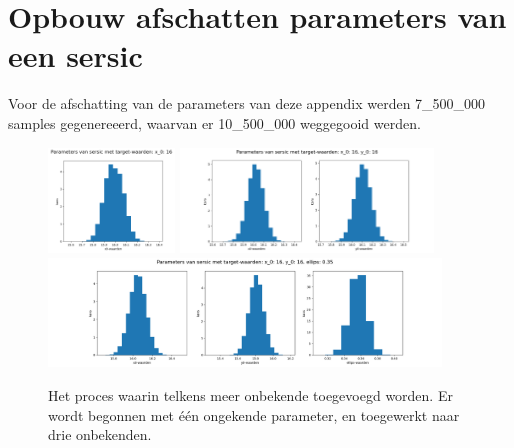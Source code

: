 \section{Opbouw afschatten parameters van een sersic}
Voor de afschatting van de parameters van deze appendix werden 7\_500\_000 samples gegenereeerd, waarvan er 10\_500\_000 weggegooid werden.
\label{appendix: opbouw}
\begin{figure}[H]
    \begin{minipage}{0.95\textwidth}
        \centering
        \includegraphics[width=0.3\textwidth]{Figures/1_sersic_verschillende_parameters/sersic_parameters_metropolis_7500000_1500000_10_x0_0.png}
        \centering
        \vspace{1cm}
        \includegraphics[width=0.60\textwidth]{Figures/1_sersic_verschillende_parameters/sersic_parameters_metropolis_7500000_1500000_10_y0_0.png}
        \centering
        \vspace{1cm}
        \includegraphics[width=0.93\textwidth]{Figures/1_sersic_verschillende_parameters/sersic_parameters_metropolis_7500000_1500000_10_ellips_0.png}
    \end{minipage}
    \caption{Het proces waarin telkens meer onbekende toegevoegd worden. Er wordt begonnen met één ongekende parameter, en toegewerkt naar drie onbekenden.}
    \label{fig:1 onbekende}
\end{figure}
